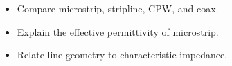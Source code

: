 \begin{objectives}
\begin{itemize}[leftmargin=1.4em,itemsep=2pt]
\item Compare microstrip, stripline, CPW, and coax.
\item Explain the effective permittivity of microstrip.
\item Relate line geometry to characteristic impedance.
\end{itemize}
\end{objectives}
